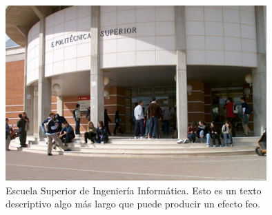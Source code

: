 \begin{figure}[p] 
\captionsetup{width=0.8\linewidth}
\begin{center}
\includegraphics[width=10cm]{figs/esiiab.png}
\end{center}
\caption[Escuela Superior de Ingeniería Informática II]{Escuela Superior de Ingeniería Informática. Esto es un texto descriptivo algo más largo que puede producir un efecto feo.}
\label{fig:esiiabII}
\captionsetup{width=0.9\linewidth}
\end{figure}

